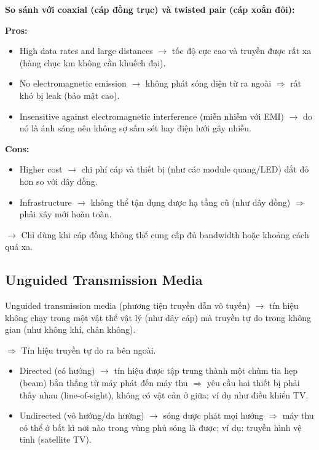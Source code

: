 \noindent
\textbf{So sánh với coaxial (cáp đồng trục) và twisted pair (cáp xoắn đôi):}
\medskip

\noindent
\textbf{Pros:}

\begin{itemize}
    \item High data rates and large distances $\rightarrow$ tốc độ cực cao và truyền được rất xa (hàng chục km không cần khuếch đại).
    \item No electromagnetic emission $\rightarrow$ không phát sóng điện từ ra ngoài $\Rightarrow$ rất khó bị leak (bảo mật cao).
    \item Insensitive against electromagnetic interference (miễn nhiễm với EMI) $\rightarrow$ do nó là ánh sáng nên không sợ sấm sét hay điện lưới gây nhiễu.
\end{itemize}
\medskip

\textbf{Cons:}

\begin{itemize}
    \item Higher cost $\rightarrow$ chi phí cáp và thiết bị (như các module quang/LED) đắt đỏ hơn so với dây đồng.
    \item Infrastructure $\rightarrow$ không thể tận dụng được hạ tầng cũ (như dây đồng) $\Rightarrow$ phải xây mới hoàn toàn.
\end{itemize}

\noindent
$\rightarrow$ Chỉ dùng khi cáp đồng không thể cung cấp đủ bandwidth hoặc khoảng cách quá xa.
\medskip

\subsection{Unguided Transmission Media}

\noindent
Unguided transmission media (phương tiện truyền dẫn vô tuyến) $\rightarrow$ tín hiệu không chạy trong một vật thể vật lý (như dây cáp) mà truyền tự do trong không gian (như không khí, chân không).

$\Rightarrow$ Tín hiệu truyền tự do ra bên ngoài.

\begin{itemize}
    \item Directed (có hướng) $\rightarrow$ tín hiệu được tập trung thành một chùm tia hẹp (beam) bắn thẳng từ máy phát đến máy thu $\Rightarrow$ yêu cầu hai thiết bị phải thấy nhau (line-of-sight), không có vật cản ở giữa; ví dụ như điều khiển TV.
    \item Undirected (vô hướng/đa hướng) $\rightarrow$ sóng được phát mọi hướng $\Rightarrow$ máy thu có thể ở bất kì nơi nào trong vùng phủ sóng là được; ví dụ: truyền hình vệ tinh (satellite TV).
\end{itemize}
\medskip


